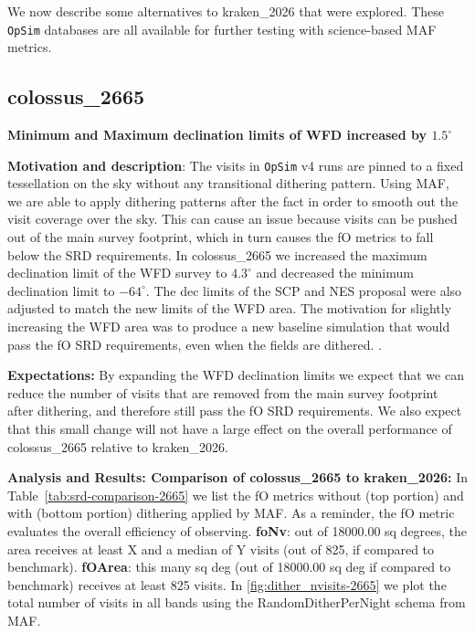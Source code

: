 \documentclass[DM,authoryear,toc]{lsstdoc}
\newcommand{\opsim}{\texttt{OpSim}\xspace}
\begin{document}
We now describe some alternatives to kraken\_2026 that were explored.
These \opsim databases are all available for further testing with science-based MAF metrics.

\subsection{colossus\_2665} \label{colossus2665}

\textbf{Minimum and Maximum declination limits of WFD increased by $1.5^{\circ}$}

\textbf{Motivation and description}: The visits in \opsim v4 runs are pinned to a fixed tessellation on the sky without any transitional dithering pattern.
Using MAF, we are able to apply dithering patterns after the fact in order to smooth out the visit coverage over the sky. This can cause an issue because
visits can be pushed out of the main survey footprint, which in turn causes the fO metrics to fall below the SRD requirements. In colossus\_2665
we increased the maximum declination limit of the WFD survey to $4.3^{\circ}$ and decreased the minimum declination limit to $-64^{\circ}$. The dec
limits of the SCP and NES proposal were also adjusted to match the new limits of the WFD area. The motivation for slightly increasing the WFD
area was to produce a new baseline simulation that would pass the fO SRD requirements, even when the fields are dithered. .


\textbf{Expectations:} By expanding the WFD declination limits we expect that we can reduce the number of visits that are removed from
the main survey footprint after dithering, and therefore still pass the fO SRD requirements. We also expect that this small change will not have a large
effect on the overall performance of colossus\_2665 relative to kraken\_2026.

\textbf{Analysis and Results: Comparison of colossus\_2665 to kraken\_2026:} In Table~\ref{tab:srd-comparison-2665} we list the
fO metrics without (top portion) and with (bottom portion) dithering applied by MAF. As a reminder, the fO metric evaluates the overall
efficiency of observing. \textbf{foNv}: out of 18000.00 sq degrees, the area receives at least X and  a median of Y visits (out of 825,
if compared to benchmark). \textbf{fOArea}: this many sq deg (out of 18000.00 sq deg if compared to benchmark) receives at least 825 visits.
In \autoref{fig:dither_nvisits-2665} we plot the total number of visits in all bands using the RandomDitherPerNight schema from MAF.
\end{document}
